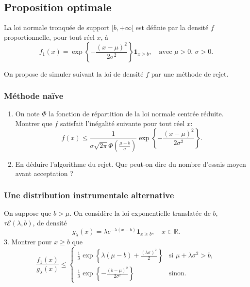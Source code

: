 \documentclass[]{article}
\begin{document}
\hypertarget{proposition-optimale}{%
\subsection{Proposition optimale}\label{proposition-optimale}}

La loi normale tronquée de support \([b, +\infty[\) est définie par la
densité \(f\) proportionnelle, pour tout réel \(x\), à
\[f_1(x) = \exp\left\lbrace -\frac{(x-\mu)^2}{2\sigma^2}\right\rbrace\mathbf{1}_{x\geq b},
\quad\text{avec $\mu > 0$, $\sigma > 0$}.\]

On propose de simuler suivant la loi de densité \(f\) par une méthode de
rejet.

\hypertarget{muxe9thode-nauxefve}{%
\subsubsection{Méthode naïve}\label{muxe9thode-nauxefve}}

\begin{enumerate}
\def\labelenumi{\arabic{enumi}.}
\item
  On note \(\Phi\) la fonction de répartition de la loi normale centrée
  réduite. Montrer que \(f\) satisfait l'inégalité suivante pour tout
  réel \(x\):
  \[f(x)\leq \frac{1}{\sigma\sqrt{2\pi}\Phi(\frac{\mu-b}{\sigma})}\exp\left\lbrace -\frac{(x-\mu)^2}{2\sigma^2}\right\rbrace.\]
\item
  En déduire l'algorithme du rejet. Que peut-on dire du nombre d'essais
  moyen avant acceptation ?
\end{enumerate}

\hypertarget{une-distribution-instrumentale-alternative}{%
\subsubsection{Une distribution instrumentale
alternative}\label{une-distribution-instrumentale-alternative}}

On suppose que \(b > \mu\). On considère la loi exponentielle translatée
de \(b\), \(\tau\mathcal{E}(\lambda, b)\), de densité
\[g_{\lambda}(x) = \lambda e^{-\lambda(x-b)}\mathbf{1}_{x\geq b},\quad x\in\mathbb{R}.\]
3. Montrer pour \(x\geq b\) que
\[\frac{f_1(x)}{g_{\lambda}(x)}\leq \left\lbrace
\begin{array}{lr}
\frac{1}{\lambda}\exp\left\lbrace 
    \lambda(\mu-b)+\frac{(\lambda\sigma)^2}{2}
    \right\rbrace & \text{si } \mu+\lambda\sigma^2 > b,\\
    \frac{1}{\lambda}\exp\left\lbrace 
    -\frac{(b-\mu)^2}{2\sigma^2}
    \right\rbrace & \text{sinon}.
\end{array}
\right. \]
\end{document}
